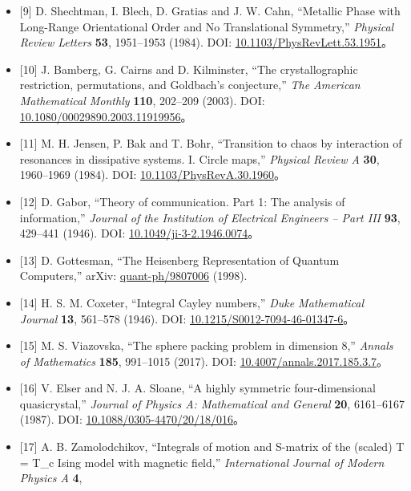 \documentclass[
  a4paper,
]{ltjsarticle}
\begin{document}
\begin{itemize}
\item
  {[}9{]} D. Shechtman, I. Blech, D. Gratias and J. W. Cahn, ``Metallic
  Phase with Long-Range Orientational Order and No Translational
  Symmetry,'' \emph{Physical Review Letters} \textbf{53}, 1951--1953
  (1984). DOI:
  \href{https://doi.org/10.1103/PhysRevLett.53.1951}{10.1103/PhysRevLett.53.1951}。
\item
  {[}10{]} J. Bamberg, G. Cairns and D. Kilminster, ``The
  crystallographic restriction, permutations, and Goldbach's
  conjecture,'' \emph{The American Mathematical Monthly} \textbf{110},
  202--209 (2003). DOI:
  \href{https://doi.org/10.1080/00029890.2003.11919956}{10.1080/00029890.2003.11919956}。
\item
  {[}11{]} M. H. Jensen, P. Bak and T. Bohr, ``Transition to chaos by
  interaction of resonances in dissipative systems. I. Circle maps,''
  \emph{Physical Review A} \textbf{30}, 1960--1969 (1984). DOI:
  \href{https://doi.org/10.1103/PhysRevA.30.1960}{10.1103/PhysRevA.30.1960}。
\item
  {[}12{]} D. Gabor, ``Theory of communication. Part 1: The analysis of
  information,'' \emph{Journal of the Institution of Electrical
  Engineers -- Part III} \textbf{93}, 429--441 (1946). DOI:
  \href{https://doi.org/10.1049/ji-3-2.1946.0074}{10.1049/ji-3-2.1946.0074}。
\item
  {[}13{]} D. Gottesman, ``The Heisenberg Representation of Quantum
  Computers,'' arXiv:
  \href{https://arxiv.org/abs/quant-ph/9807006}{quant-ph/9807006}
  (1998).
\item
  {[}14{]} H. S. M. Coxeter, ``Integral Cayley numbers,'' \emph{Duke
  Mathematical Journal} \textbf{13}, 561--578 (1946). DOI:
  \href{https://doi.org/10.1215/S0012-7094-46-01347-6}{10.1215/S0012-7094-46-01347-6}。
\item
  {[}15{]} M. S. Viazovska, ``The sphere packing problem in dimension
  8,'' \emph{Annals of Mathematics} \textbf{185}, 991--1015 (2017). DOI:
  \href{https://doi.org/10.4007/annals.2017.185.3.7}{10.4007/annals.2017.185.3.7}。
\item
  {[}16{]} V. Elser and N. J. A. Sloane, ``A highly symmetric
  four-dimensional quasicrystal,'' \emph{Journal of Physics A:
  Mathematical and General} \textbf{20}, 6161--6167 (1987). DOI:
  \href{https://doi.org/10.1088/0305-4470/20/18/016}{10.1088/0305-4470/20/18/016}。
\item
  {[}17{]} A. B. Zamolodchikov, ``Integrals of motion and S-matrix of
  the (scaled) T = T\_c Ising model with magnetic field,''
  \emph{International Journal of Modern Physics A} \textbf{4},

\end{itemize}
\end{document}
